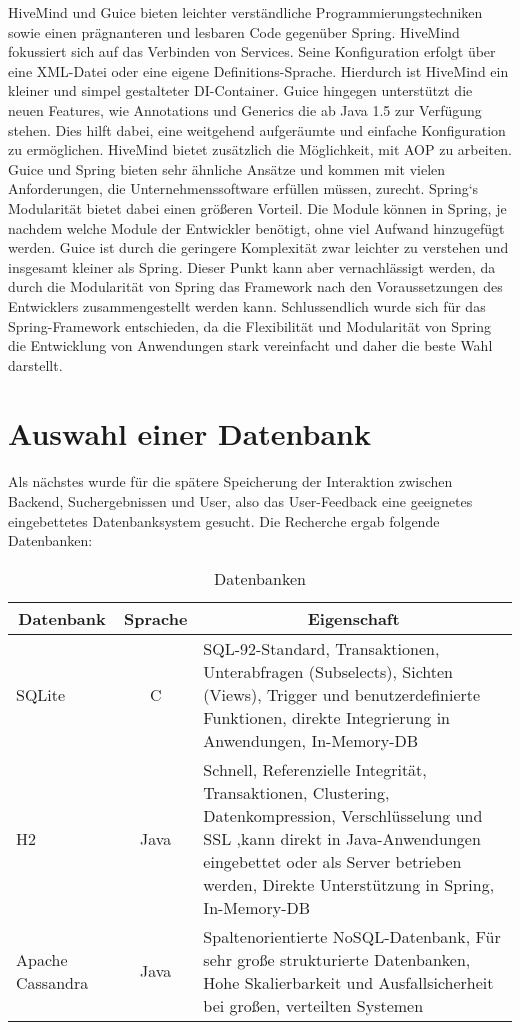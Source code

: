 HiveMind und Guice bieten leichter verständliche Programmierungstechniken sowie einen prägnanteren und lesbaren Code gegenüber Spring.
HiveMind fokussiert sich auf das Verbinden von Services. 
Seine Konfiguration erfolgt über eine XML-Datei oder eine eigene Definitions-Sprache. 
Hierdurch ist HiveMind ein kleiner und simpel gestalteter DI-Container.
Guice hingegen unterstützt die neuen Features, wie Annotations und Generics die ab Java 1.5 zur Verfügung stehen. 
Dies hilft dabei, eine weitgehend aufgeräumte und einfache Konfiguration zu ermöglichen.
HiveMind bietet zusätzlich die Möglichkeit, mit AOP zu arbeiten. 
Guice und Spring bieten sehr ähnliche Ansätze und kommen mit vielen Anforderungen, die Unternehmenssoftware erfüllen müssen, zurecht.
Spring`s Modularität bietet dabei einen größeren Vorteil. 
Die Module können in Spring, je nachdem welche Module der Entwickler benötigt, ohne viel Aufwand hinzugefügt werden. 
Guice ist durch die geringere Komplexität zwar leichter zu verstehen und insgesamt kleiner als Spring. 
Dieser Punkt kann aber vernachlässigt werden, da durch die Modularität von Spring das Framework nach den Voraussetzungen des Entwicklers zusammengestellt werden kann.
Schlussendlich wurde sich für das Spring-Framework entschieden, da die Flexibilität und Modularität von Spring die Entwicklung von Anwendungen stark vereinfacht und daher die beste Wahl darstellt.

\section{Auswahl einer Datenbank}
Als nächstes wurde für die spätere Speicherung der Interaktion zwischen Backend, Suchergebnissen und User, also das User-Feedback eine geeignetes eingebettetes Datenbanksystem gesucht. 
Die Recherche ergab folgende Datenbanken:

\begin{table}[h!]
	\centering
	
	\begin{tabularx}{\textwidth}{|l|c|X|}
		
		\hline
		\multicolumn{1}{|c|}{{\textbf{Datenbank}}} & \multicolumn{1}{c|}{{\textbf{Sprache}}} & \multicolumn{1}{c|}{{\textbf{Eigenschaft}}} \\
		\hline	     
		SQLite & C & SQL-92-Standard,  Transaktionen, Unterabfragen (Subselects), Sichten (Views), Trigger und benutzerdefinierte Funktionen, direkte Integrierung in Anwendungen, In-Memory-DB \\
		\hline
		H2 & Java &   Schnell, Referenzielle Integrität, Transaktionen, Clustering, Datenkompression, Verschlüsselung und SSL ,kann direkt in Java-Anwendungen eingebettet oder als Server betrieben werden, Direkte Unterstützung in Spring, In-Memory-DB \\
		\hline
		Apache Cassandra & Java & Spaltenorientierte NoSQL-Datenbank, Für sehr große strukturierte Datenbanken, Hohe Skalierbarkeit und Ausfallsicherheit bei großen, verteilten Systemen \\
		\hline
	\end{tabularx}
	\caption{Datenbanken}
	\label{tbl:dbs}
\end{table}

